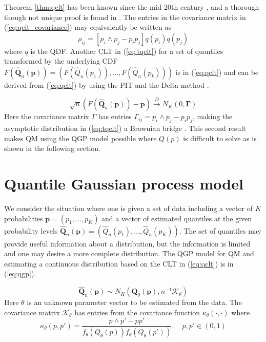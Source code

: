 Theorem \ref{thm:qclt} has been known since the mid 20th century 
\cite[]{cramer1951mathematical}, and a thorough though not unique proof is 
found in \cite{walker1968note}. The entries in the covariance matrix in 
(\ref{eq:qclt_covariance}) may equivalently be written as
\begin{equation}
    \rho_{ij} = [p_i \wedge p_j - p_i p_j]q(p_i)q(p_j)
    \label{eq:qgp_simp_cov}
\end{equation}
where $q$ is the QDF. Another CLT in (\ref{eq:tqclt}) for a set of quantiles 
transformed by the underlying CDF $F(\hat{\boldsymbol{Q}}_n(\boldsymbol{p})) = 
(F(\hat{Q}_n(p_1)), ..., F(\hat{Q}_n(p_k)))$ is in (\ref{eq:qclt}) and can be 
derived from (\ref{eq:qclt}) by using the PIT and the Delta method 
\cite[]{parzen2004quantile}.

\begin{equation}
    \label{eq:tqclt}
    \sqrt{n}(F(\hat{\boldsymbol{Q}}_n(\boldsymbol{p})) - \boldsymbol{p}) 
    \overset{D}{\rightarrow} N_K(0, \boldsymbol{\Gamma})
\end{equation}
Here the covariance matrix $\Gamma$ has entries $\Gamma_{ij} = p_i \wedge p_j - 
p_i p_j$, making the asymptotic distribution in (\ref{eq:tqclt}) a 
Brownian bridge \cite[]{chow2009brownian}. This second result makes QM using 
the QGP model possible where $Q(p)$ is difficult to solve as is shown in the 
following section.




\section{Quantile Gaussian process model} \label{sec:qgp_model}

We consider the situation where one is given a set of data including a vector 
of $K$ probabilities $\boldsymbol{p} = (p_1, ..., p_K)$ and a vector of 
estimated quantiles at the given probability levels 
$\hat{\boldsymbol{Q}}_n(\boldsymbol{p}) = (\hat{Q}_n(p_1), ..., \hat{Q}_n(p_K))$. 
The set of quantiles may provide useful information about a distribution, but 
the information is limited and one may desire a more complete distribution.
The QGP model for QM and estimating a continuous distribution based on the CLT 
in (\ref{eq:qclt}) is in (\ref{eq:qgp}).



\begin{equation}
    \label{eq:qgp}
\hat{\boldsymbol{Q}}_n(\boldsymbol{p}) \sim N_K(\boldsymbol{Q}_{\theta}(\boldsymbol{p}), n^{-1} \boldsymbol{\mathcal{K}}_{\theta})
\end{equation}
Here $\theta$ is an unknown parameter vector to be estimated from the data. The 
covariance matrix $\boldsymbol{\mathcal{K}}_{\theta}$ has entries from the 
covariance function $\kappa_{\theta}(\cdot, \cdot)$ where 
\[
\kappa_{\theta}(p, p') = \frac{p\wedge p' - p p'}{f_{\theta}(Q_{\theta}(p)) f_{\theta}(Q_{\theta}(p'))}, \quad p, p' \in (0,1)
\]

